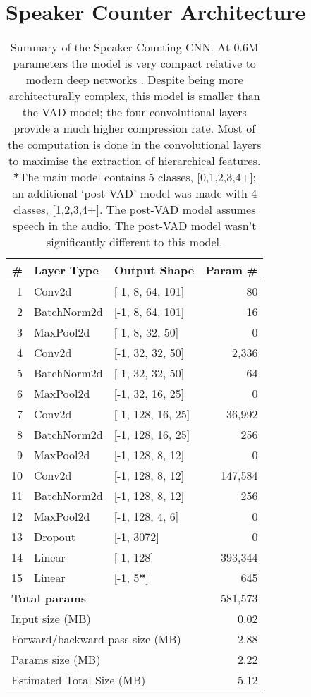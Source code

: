 \section{Speaker Counter Architecture}
\label{app:SC_arc}
\begin{table}[H]
\centering
\begin{tabular}{|r l l r|}
\hline
\textbf{\#} & \textbf{Layer Type} & \textbf{Output Shape} & \textbf{Param \#} \\
\hline
1  & Conv2d       & [-1, 8, 64, 101]   & 80 \\
2  & BatchNorm2d  & [-1, 8, 64, 101]   & 16 \\
3  & MaxPool2d    & [-1, 8, 32, 50]    & 0 \\
4  & Conv2d       & [-1, 32, 32, 50]   & 2,336 \\
5  & BatchNorm2d  & [-1, 32, 32, 50]   & 64 \\
6  & MaxPool2d    & [-1, 32, 16, 25]   & 0 \\
7  & Conv2d       & [-1, 128, 16, 25]  & 36,992 \\
8  & BatchNorm2d  & [-1, 128, 16, 25]  & 256 \\
9  & MaxPool2d    & [-1, 128, 8, 12]   & 0 \\
10 & Conv2d       & [-1, 128, 8, 12]   & 147,584 \\
11 & BatchNorm2d  & [-1, 128, 8, 12]   & 256 \\
12 & MaxPool2d    & [-1, 128, 4, 6]    & 0 \\
13 & Dropout      & [-1, 3072]         & 0 \\
14 & Linear       & [-1, 128]          & 393,344 \\
15 & Linear       & [-1, 5\textbf{*}]            & 645 \\
\hline
\multicolumn{3}{|l|}{\textbf{Total params}}         & 581,573 \\
\hline
\multicolumn{3}{|l|}{Input size (MB)}                 & 0.02 \\
\multicolumn{3}{|l|}{Forward/backward pass size (MB)} & 2.88 \\
\multicolumn{3}{|l|}{Params size (MB)}                & 2.22 \\
\multicolumn{3}{|l|}{Estimated Total Size (MB)}       & 5.12 \\
\hline
\end{tabular}
\caption{Summary of the Speaker Counting CNN. At 0.6M parameters the model is very compact relative to modern deep networks \cite{modelsizes}. Despite being more architecturally complex, this model is smaller than the VAD model; the four convolutional layers provide a much higher compression rate. Most of the computation is done in the convolutional layers to maximise the extraction of hierarchical features.
\noindent \textbf{*}The main model contains 5 classes, [0,1,2,3,4+]; an additional `post-VAD' model was made with 4 classes, [1,2,3,4+]. The post-VAD model assumes speech in the audio. The post-VAD model wasn't significantly different to this model.}
\end{table}

